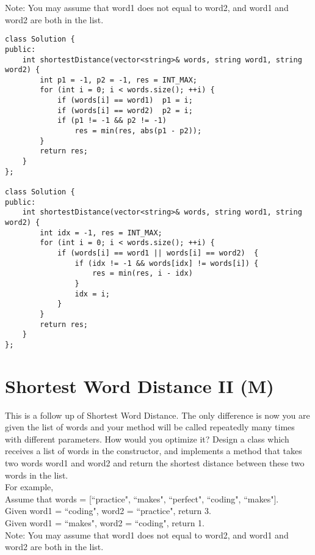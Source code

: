 Note: You may assume that word1 does not equal to word2, and word1 and word2 are both in the list.\\

\begin{lstlisting}
class Solution {
public:
    int shortestDistance(vector<string>& words, string word1, string word2) {
        int p1 = -1, p2 = -1, res = INT_MAX;
        for (int i = 0; i < words.size(); ++i) {
            if (words[i] == word1)  p1 = i;
            if (words[i] == word2)  p2 = i;
            if (p1 != -1 && p2 != -1)
                res = min(res, abs(p1 - p2));
        }
        return res;
    }
};

class Solution {
public:
    int shortestDistance(vector<string>& words, string word1, string word2) {
        int idx = -1, res = INT_MAX;
        for (int i = 0; i < words.size(); ++i) {
            if (words[i] == word1 || words[i] == word2)  {
                if (idx != -1 && words[idx] != words[i]) {
                    res = min(res, i - idx)
                }
                idx = i;
            }
        }
        return res;
    }
};
\end{lstlisting}


\section{Shortest Word Distance II (M)}
This is a follow up of Shortest Word Distance. The only difference is now you are given the list of words and your method will be called repeatedly many times with different parameters. How would you optimize it? Design a class which receives a list of words in the constructor, and implements a method that takes two words word1 and word2 and return the shortest distance between these two words in the list.\\

For example,\\
Assume that words = [``practice", ``makes", ``perfect", ``coding", ``makes"].\\
Given word1 = ``coding", word2 = ``practice", return 3.\\
Given word1 = ``makes", word2 = ``coding", return 1.\\

Note: You may assume that word1 does not equal to word2, and word1 and word2 are both in the list.\\

